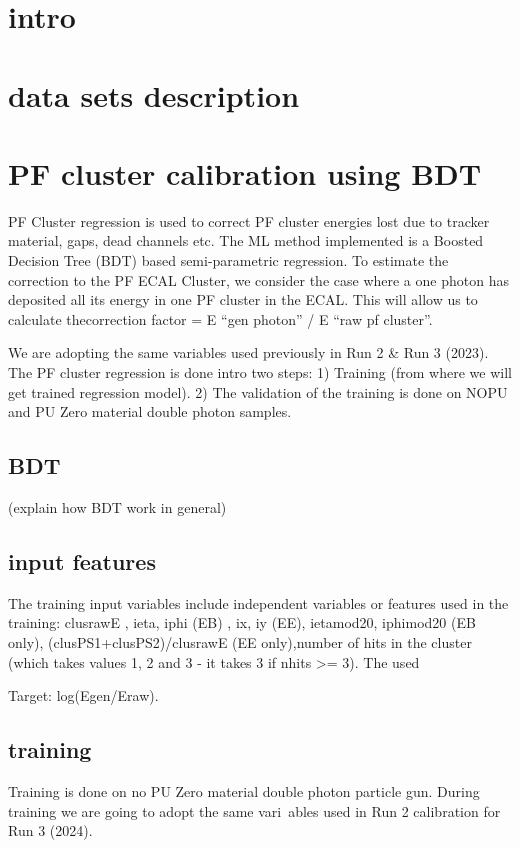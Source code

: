 
\section{intro}

\section{data sets description}

\section{PF cluster calibration using BDT}
PF Cluster regression is used to correct PF cluster energies lost due to tracker material, gaps, dead channels etc. The ML method implemented is a Boosted Decision Tree (BDT) based semi-parametric regression. To estimate the correction to  the PF ECAL Cluster, we consider the case where a one photon has deposited all its energy in one PF cluster in the ECAL. This will allow us to calculate thecorrection factor = E “gen photon” / E “raw pf cluster”.

We are adopting the same variables used previously in Run 2 & Run 3 (2023). The PF cluster regression is done intro two steps:
1) Training (from where we will get trained regression model).
2) The validation of the training is done on NOPU and PU Zero material double photon samples.

\subsection{BDT}
(explain how BDT work in general)

\subsection{input features}
The training input variables include independent variables or features used in the training:
clusrawE , ieta, iphi (EB) , ix, iy (EE), ietamod20, iphimod20 (EB only), (clusPS1+clusPS2)/clusrawE (EE only),number of hits in the cluster (which takes values 1, 2 and 3 - it takes 3 if nhits >= 3). The used

Target: log(Egen/Eraw).

\subsection{training}
Training is done on no PU Zero material double photon particle gun. During training we are going to adopt the same vari\
ables used in Run 2 calibration for Run 3 (2024).

